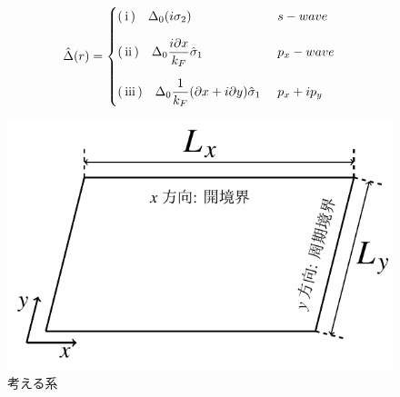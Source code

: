 \documentclass{jarticle}
\begin{document}
\begin{align}
\hat{\Delta}(r)=
\begin{cases}
$\rm(\hspace{.18em}i\hspace{.18em})\quad$\Delta_0(i\sigma_2)
& s-wave
\vspace*{1em}\\
$\rm(\hspace{.18em}ii\hspace{.18em})$\quad\Delta_0\dfrac{i\partial x}{k_F}\hat\sigma_1
&p_x-wave
\vspace*{1em}\\
$\rm(\hspace{.18em}iii\hspace{.18em})$\quad\Delta_0\dfrac{1}{k_F}(\partial x+i\partial y)\hat\sigma_1\
&p_x+ip_y
\end{cases}
\label{delta}
\end{align}

\begin{figure}[H]
	\centering
	\includegraphics[scale=1]{./figure_fix.pdf}
	\caption{考える系}
	\label{system}
\end{figure}
\end{document}
